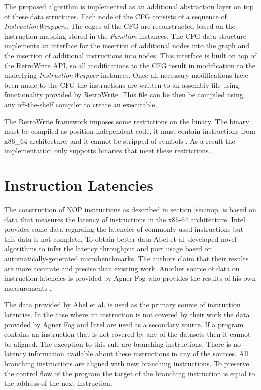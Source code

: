 The proposed algorithm is implemented as an additional abstraction layer on top of these data structures. 
Each node of the CFG consists of a sequence of \textit{InstructionWrapper}s. 
The edges of the CFG are reconstructed based on the instruction mapping stored in the \textit{Function} instances. 
The CFG data structure implements  an interface for the insertion of additional nodes into the graph and the insertion of additional instructions into nodes. 
This interface is built on top of the RetroWrite API, so all modifications to the CFG result in modification to the underlying \textit{InstructionWrapper} instances. 
Once all necessary modifications have been made to the CFG the instructions are written to an assembly file using functionality provided by RetroWrite. 
This file can be then be compiled using any off-the-shelf compiler to create an executable. 

The RetroWrite framework imposes some restrictions on the binary. The binary must be compiled as position independent code, it must contain instructions from x86\_64 architecture, and 
it cannot be stripped of symbols \cite{hexhive}. 
As a result the implementation only supports binaries that meet these restrictions. 


\section{Instruction Latencies}
\label{sec:latencies}
The construction of NOP instructions as described in section \ref{sec:nop} is based on data that measures the latency of instructions in the x86-64 architecture.
Intel provides some data regarding the latencies of commonly used instructions \cite{intel-ref-manual} but this data is not complete.
To obtain better data Abel et al.  \cite{uops} developed novel algorithms to infer the latency throughput and port usage based on automatically-generated microbenchmarks. 
The authors claim that their results are more accurate and precise than existing work. 
Another source of data on instruction latencies is provided by Agner Fog who provides the results of his own measurements \cite{fog_2021}. 

The data provided by Abel et al. \cite{uops} is  used as the primary source of instruction latencies. In the case where an instruction is not covered by their work the data 
provided by Agner Fog \cite{fog_2021} and Intel are used as a secondary source. If a program contains an instruction that is not covered by any of the datasets then it cannot
be aligned. 
The exception to this rule are branching instructions. 
There is no latency information available about these instructions in any of the sources. 
All branching instructions are aligned with new branching instructions. 
To preserve the control flow of the program the target of the branching instruction is equal to the address of the next instruction. 
